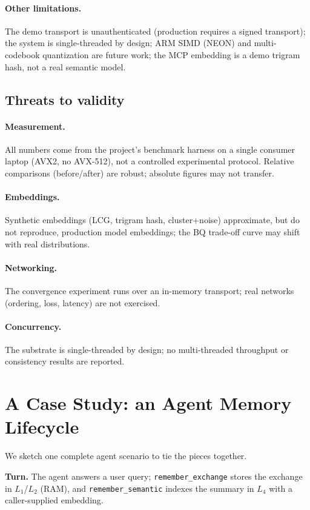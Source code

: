 \documentclass[11pt,twocolumn]{article}
\begin{document}
\paragraph{Other limitations.}
The demo transport is unauthenticated (production requires a signed transport);
the system is single-threaded by design; ARM SIMD (NEON) and multi-codebook
quantization are future work; the MCP embedding is a demo trigram hash, not a
real semantic model.

\subsection{Threats to validity}
\label{sec:validity}

\paragraph{Measurement.}
All numbers come from the project's benchmark harness on a single consumer
laptop (AVX2, no AVX-512), not a controlled experimental protocol. Relative
comparisons (before/after) are robust; absolute figures may not transfer.
\paragraph{Embeddings.}
Synthetic embeddings (LCG, trigram hash, cluster+noise) approximate, but do
not reproduce, production model embeddings; the BQ trade-off curve may shift
with real distributions.
\paragraph{Networking.}
The convergence experiment runs over an in-memory transport; real networks
(ordering, loss, latency) are not exercised.
\paragraph{Concurrency.}
The substrate is single-threaded by design; no multi-threaded throughput or
consistency results are reported.

\section{A Case Study: an Agent Memory Lifecycle}
\label{sec:casestudy}

We sketch one complete agent scenario to tie the pieces together.

\textbf{Turn.} The agent answers a user query; \texttt{remember\_exchange}
stores the exchange in $L_1$/$L_2$ (RAM), and \texttt{remember\_semantic}
indexes the summary in $L_4$ with a caller-supplied embedding.
\end{document}
